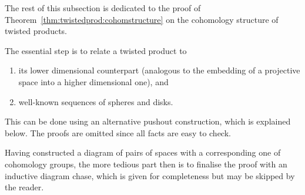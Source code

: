 The rest of this subsection is dedicated to the proof of
Theorem~\ref{thm:twistedprod:cohomstructure} on the cohomology
structure of twisted products.

The essential step is to relate a twisted product to
\begin{enumerate}[1.]
\item its lower dimensional counterpart (analogous to the embedding of
  a projective space into a higher dimensional one), and
\item well-known sequences of spheres and disks.
\end{enumerate}
This can be done using an alternative pushout construction, which is
explained below. The proofs are omitted since all facts are easy to
check.

Having constructed a diagram of pairs of spaces with a corresponding
one of cohomology groups, the more tedious part then is to finalise
the proof with an inductive diagram chase, which is given for
completeness but may be skipped by the reader.

